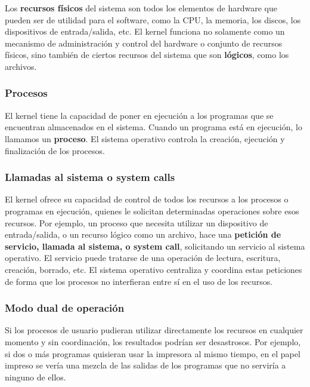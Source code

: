 \documentclass[spanish,A4,]{article}
\begin{document}
Los \textbf{recursos físicos} del sistema son todos los elementos de
hardware que pueden ser de utilidad para el software, como la CPU, la
memoria, los discos, los dispositivos de entrada/salida, etc. El kernel
funciona no solamente como un mecanismo de administración y control del
hardware o conjunto de recursos físicos, sino también de ciertos
recursos del sistema que son \textbf{lógicos}, como los archivos.

\subsubsection{Procesos}\label{procesos}

El kernel tiene la capacidad de poner en ejecución a los programas que
se encuentran almacenados en el sistema. Cuando un programa está en
ejecución, lo llamamos un \textbf{proceso}. El sistema operativo
controla la creación, ejecución y finalización de los procesos.

\subsubsection{Llamadas al sistema o system
calls}\label{llamadas-al-sistema-o-system-calls}

El kernel ofrece su capacidad de control de todos los recursos a los
procesos o programas en ejecución, quienes le solicitan determinadas
operaciones sobre esos recursos. Por ejemplo, un proceso que necesita
utilizar un dispositivo de entrada/salida, o un recurso lógico como un
archivo, hace una \textbf{petición de servicio, llamada al sistema, o
system call}, solicitando un servicio al sistema operativo. El servicio
puede tratarse de una operación de lectura, escritura, creación,
borrado, etc. El sistema operativo centraliza y coordina estas
peticiones de forma que los procesos no interfieran entre sí en el uso
de los recursos.

\subsubsection{Modo dual de operación}\label{modo-dual-de-operaciuxf3n}

Si los procesos de usuario pudieran utilizar directamente los recursos
en cualquier momento y sin coordinación, los resultados podrían ser
desastrosos. Por ejemplo, si dos o más programas quisieran usar la
impresora al mismo tiempo, en el papel impreso se vería una mezcla de
las salidas de los programas que no serviría a ninguno de ellos.
\end{document}
